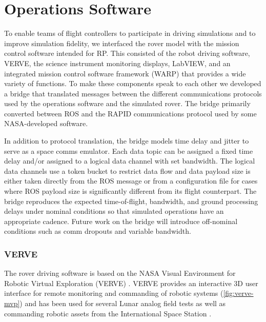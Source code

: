 \documentclass[twocolumn,letterpaper]{IEEEAerospaceCLS}  %
\begin{document}
\section{Operations Software}
\label{sec:ops-software}

To enable teams of flight controllers to participate in driving simulations and to improve simulation fidelity, we interfaced the rover model with the mission control software intended for RP.  
This consisted of the robot driving software, VERVE, the science instrument monitoring displays, LabVIEW, and an integrated mission control software framework (WARP) that provides a wide variety of functions.  
To make these components speak to each other we developed a bridge that translated messages between the different communications protocols used by the operations software and the simulated rover.  
The bridge primarily converted between ROS and the RAPID communications protocol\cite{torres2009rapid} used by some NASA-developed software.  

In addition to protocol translation, the bridge models time delay and jitter to serve as a space comms emulator.  
Each data topic can be assigned a fixed time delay and/or assigned to a logical data channel with set bandwidth.  
The logical data channels use a token bucket to restrict data flow and data payload size is either taken directly from the ROS message or from a configuration file for cases where ROS payload size is significantly different from its flight counterpart.  
The bridge reproduces the expected time-of-flight, bandwidth, and ground processing delays under nominal conditions so that simulated operations have an appropriate cadence.  
Future work on the bridge will introduce off-nominal conditions such as comm dropouts and variable bandwidth.  

\subsubsection{VERVE}

The rover driving software is based on the NASA Visual Environment for Robotic Virtual Exploration (VERVE) \cite{lee2013reusable}.  VERVE provides an interactive 3D user interface for remote monitoring and commanding of robotic systems (\cref{fig:verve-mvp}) and has been used for several Lunar analog field tests \cite{deans2009robotic} \cite{fong2010robotic} as well as commanding robotic assets from the International Space Station \cite{bualat2013surface}.
\end{document}
